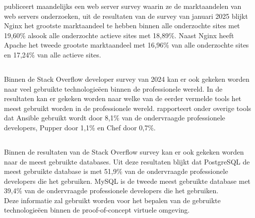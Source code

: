 \textcite{NetcraftSurvey} publiceert maandelijks een web server survey waarin ze de marktaandelen van web servers onderzoeken, uit de resultaten van de survey van januari 2025 blijkt Nginx het grootste marktaandeel te hebben binnen alle onderzochte sites met 19,60\% alsook alle onderzochte actieve sites met 18,89\%.
Naast Nginx heeft Apache het tweede grootste marktaandeel met 16,96\% van alle onderzochte sites en 17,24\% van alle actieve sites. \\

\subsection{}
\label{subsec:Automatiseringstools}

Binnen de Stack Overflow developer survey van 2024 kan er ook gekeken worden naar veel gebruikte technologieëen binnen de professionele wereld.
In de resultaten kan er gekeken worden naar welke van de eerder vermelde tools het meest gebruikt worden in de professionele wereld. \autocite{StackOverflowSurvey} rapporteert onder overige tools dat Ansible gebruikt wordt door 8,1\% van de ondervraagde professionele developers, Pupper door 1,1\% en Chef door 0,7\%. \\

\subsection{}
\label{subsec:Databases}

Binnen de resultaten van de Stack Overflow survey kan er ook gekeken worden naar de meest gebruikte databases. Uit deze resultaten blijkt dat PostgreSQL de meest gebruikte database is met 51,9\% van de ondervraagde professionele developers die het gebruiken. MySQL is de tweede meest gebruikte database met 39,4\% van de ondervraagde professionele developers die het gebruiken. \autocite{StackOverflowSurvey} \\
Deze informatie zal gebruikt worden voor het bepalen van de gebruikte technologieëen binnen de proof-of-concept virtuele omgeving.

